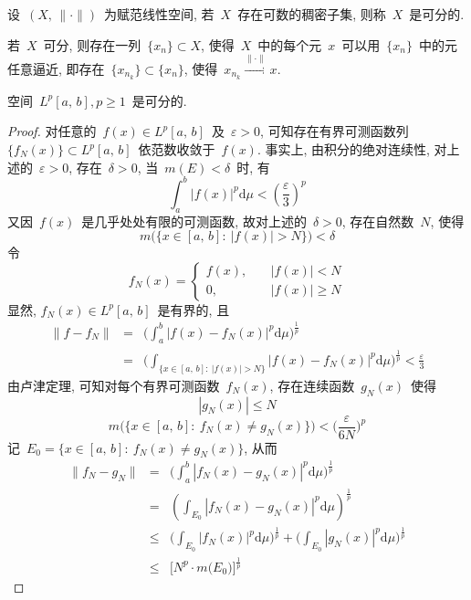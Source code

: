\begin{Definition}
设~$(X,\,\|\cdot\|)$~为赋范线性空间, 若~$X$~存在可数的稠密子集, 则称~$X$~是可分的.
\end{Definition}

若~$X$~可分, 则存在一列~$\{x_n\} \subset X$, 使得~$X$~中的每个元~$x$~可以用~$\{x_n\}$~中的元任意逼近, 即存在~$\{x_{n_k}\} \subset \{x_n\}$, 使得~$x_{n_k} \xrightarrow {\|\cdot\|} x$.

\begin{Theorem}
空间~$L^p[a,\,b], p\geqslant 1$~是可分的.
\end{Theorem}

\begin{proof}
对任意的~$f(x)\in L^p[a,\,b]$~及~$\varepsilon>0$, 可知存在有界可测函数列
~$\{f_{N}(x)\}\subset L^p[a,\,b]$~依范数收敛于~$f(x)$. 事实上, 由积分的绝对连续性, 对上述的~$\varepsilon>0$,
存在~$\delta>0$, 当~$m(E)<\delta$~时, 有
\[
\int_{a}^{b}|f(x)|^{p}\mathrm{d}\mu<(\frac{\varepsilon}{3})^{p}
\]
又因~$f(x)$~是几乎处处有限的可测函数, 故对上述的~$\delta>0$, 存在自然数~$N$, 使得
\[
m\big(\{x\in [a,\,b]:\: |f(x)|>N \}\big)<\delta
\]
令
\[
f_{N}(x)= \left\{\!\!
\begin{array}{cl}
f(x), & \quad |f(x)|<N \\[0.2cm]
0, & \quad |f(x)|\geqslant N
\end{array}
\right.
\]
显然, $f_{N}(x)\in L^p[a,\,b]$~是有界的, 且
\begin{eqnarray*}
\|f-f_{N}\|&=&\Big(\int_{a}^{b}|f(x)-f_{N}(x)|^{p}\mathrm{d}\mu\Big)^{\frac{1}{p}}\\
&=&\Big(\int_{\{x\in \left[a,\,b\right]:\: |f(x)|>N \}}|f(x)-f_{N}(x)|^{p}\mathrm{d}\mu\Big)^{\frac{1}{p}}<\frac{\varepsilon}{3}
\end{eqnarray*}
由卢津定理, 可知对每个有界可测函数~$f_{N}(x)$, 存在连续函数~$g_{N}(x)$~使得
\[
|g_{N}(x)|\leqslant N
\]
\[
m\big(\{x\in [a,\,b]:\: f_{N}(x)\neq g_{N}(x)\}\big)<\Big(\frac{\varepsilon}{6N}\Big)^{p}
\]
记~$E_0 = \{x\in [a,\,b]:\: f_{N}(x)\neq g_{N}(x)\}$, 从而
\begin{eqnarray*}
\|f_{N}-g_{N}\| &=& \Big(\int_{a}^{b}|f_{N}(x)-g_{N}(x)|^{p}\mathrm{d}\mu\Big)^{\frac{1}{p}}\\
&=&\left(\int_{E_0}|f_{N}(x)-g_{N}(x)|^{p}\mathrm{d}\mu\right)^{\frac{1}{p}}\\
&\leqslant& \Big(\int_{E_0}|f_{N}(x)|^{p}\mathrm{d}\mu\Big)^{\frac{1}{p}}
+ \Big(\int_{E_0}|g_{N}(x)|^{p}\mathrm{d}\mu\Big)^{\frac{1}{p}}\\
&\leqslant& \big[N^{p}\cdot m\big(E_0\big)\big]^{\frac{1}{p}}

\end{eqnarray*}
\end{proof}
